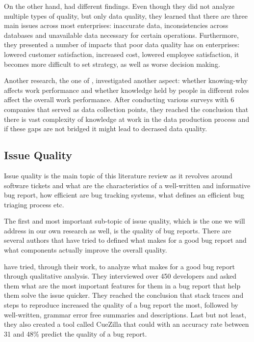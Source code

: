 \documentclass{mprop}
\begin{document}
On the other hand, \citet{redman1998impact} had different findings. Even though
they did not analyze multiple types of quality, but only data quality, they 
learned that there are three main issues across most enterprises: inaccurate
data, inconsistencies across databases and unavailable data necessary for 
certain operations. Furthermore, they presented a number of impacts that
poor data quality has on enterprises: lowered customer satisfaction, increased
cost, lowered employee satisfaction, it becomes more difficult to set strategy,
as well as worse decision making.

Another research, the one of \citet{lee2003knowing}, investigated another 
aspect: whether knowing-why affects work performance and whether knowledge held
by people in different roles affect the overall work performance. After
conducting various surveys with 6 companies that served as data collection 
points, they reached the conclusion that there is vast complexity of 
knowledge at work in the data production process and if these gaps are not 
bridged it might lead to decrased data quality.

\subsection{Issue Quality}

Issue quality is the main topic of this literature review as it revolves around
software tickets and what are the characteristics of a well-written and 
informative bug report, how efficient are bug tracking systems, what defines
an efficient bug triaging process etc. 

The first and most important sub-topic of issue quality, which is the one
we will address in our own research as well, is the quality of bug reports.
There are several authors that have tried to defined what makes for a good bug
report and what components actually improve the overall quality.

\citet{bettenburg2008makes} have tried, through their work, to analyze what 
makes for a good bug report through qualitative analysis. They interviewed over
450 developers and asked them what are the most important features for them in
a bug report that help them solve the issue quicker. They reached the conclusion 
that stack traces and steps to reproduce increased the quality of a bug report 
the most, followed by well-written, grammar error free summaries and 
descriptions. Last but not least, they also created a tool called CueZilla that 
could with an accuracy rate between 31 and 48\% predict the quality of a bug 
report. 
\end{document}
